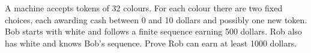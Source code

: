 A machine accepts tokens of 32 colours. For each colour there are two fixed choices, each awarding cash between 0 and 10 dollars and possibly one new token. Bob starts with white and follows a finite sequence earning 500 dollars. Rob also has white and knows Bob's sequence. Prove Rob can earn at least 1000 dollars.

